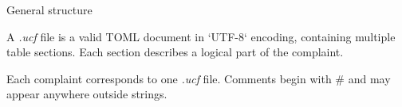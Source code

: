 
\begin{specitemize}{General structure}

  \item A \textit{.ucf} file is a valid TOML document in `UTF-8` encoding, containing multiple
    table sections. Each section describes a logical part of the complaint.

  \item Each complaint corresponds to one \textit{.ucf} file. Comments begin with \# and may
    appear anywhere outside strings.

\end{specitemize}
